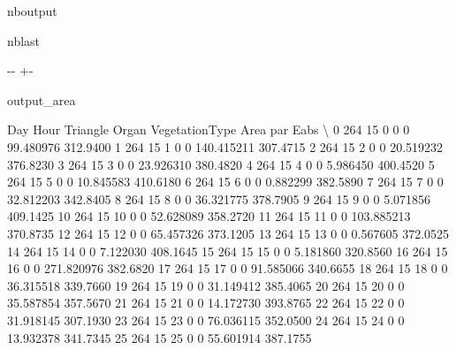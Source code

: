 \documentclass[letterpaper,10pt,english]{sphinxmanual}
\begin{document}
\begin{sphinxuseclass}{nboutput}
\begin{sphinxuseclass}{nblast}
{

\kern-\sphinxverbatimsmallskipamount\kern-\baselineskip
\kern+\FrameHeightAdjust\kern-\fboxrule
\vspace{\nbsphinxcodecellspacing}

\begin{sphinxuseclass}{output_area}
\begin{sphinxuseclass}{}


\begin{sphinxVerbatim}[commandchars=\\\{\}]
    Day  Hour  Triangle  Organ  VegetationType        Area  par Eabs  \textbackslash{}
0   264    15         0      0               0   99.480976  312.9400
1   264    15         1      0               0  140.415211  307.4715
2   264    15         2      0               0   20.519232  376.8230
3   264    15         3      0               0   23.926310  380.4820
4   264    15         4      0               0    5.986450  400.4520
5   264    15         5      0               0   10.845583  410.6180
6   264    15         6      0               0    0.882299  382.5890
7   264    15         7      0               0   32.812203  342.8405
8   264    15         8      0               0   36.321775  378.7905
9   264    15         9      0               0    5.071856  409.1425
10  264    15        10      0               0   52.628089  358.2720
11  264    15        11      0               0  103.885213  370.8735
12  264    15        12      0               0   65.457326  373.1205
13  264    15        13      0               0    0.567605  372.0525
14  264    15        14      0               0    7.122030  408.1645
15  264    15        15      0               0    5.181860  320.8560
16  264    15        16      0               0  271.820976  382.6820
17  264    15        17      0               0   91.585066  340.6655
18  264    15        18      0               0   36.315518  339.7660
19  264    15        19      0               0   31.149412  385.4065
20  264    15        20      0               0   35.587854  357.5670
21  264    15        21      0               0   14.172730  393.8765
22  264    15        22      0               0   31.918145  307.1930
23  264    15        23      0               0   76.036115  352.0500
24  264    15        24      0               0   13.932378  341.7345
25  264    15        25      0               0   55.601914  387.1755

\end{sphinxVerbatim}
\end{sphinxuseclass}
\end{sphinxuseclass}}
\end{sphinxuseclass}
\end{sphinxuseclass}
\end{document}
